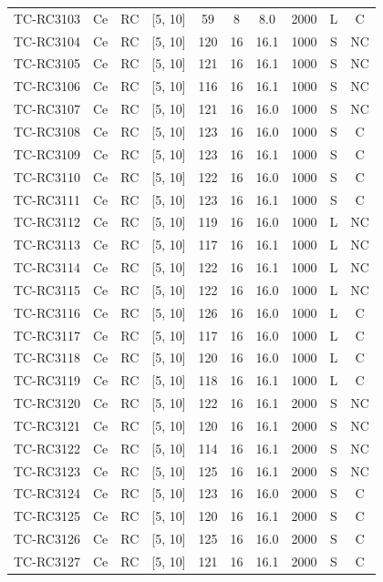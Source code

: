 \begin{longtable}{lccccccccc}
TC-RC3103 & Ce & RC & [5, 10] & 59 & 8 & 8.0 & 2000 & L & C \\
TC-RC3104 & Ce & RC & [5, 10] & 120 & 16 & 16.1 & 1000 & S & NC \\
TC-RC3105 & Ce & RC & [5, 10] & 121 & 16 & 16.1 & 1000 & S & NC \\
TC-RC3106 & Ce & RC & [5, 10] & 116 & 16 & 16.1 & 1000 & S & NC \\
TC-RC3107 & Ce & RC & [5, 10] & 121 & 16 & 16.0 & 1000 & S & NC \\
TC-RC3108 & Ce & RC & [5, 10] & 123 & 16 & 16.0 & 1000 & S & C \\
TC-RC3109 & Ce & RC & [5, 10] & 123 & 16 & 16.1 & 1000 & S & C \\
TC-RC3110 & Ce & RC & [5, 10] & 122 & 16 & 16.0 & 1000 & S & C \\
TC-RC3111 & Ce & RC & [5, 10] & 123 & 16 & 16.1 & 1000 & S & C \\
TC-RC3112 & Ce & RC & [5, 10] & 119 & 16 & 16.0 & 1000 & L & NC \\
TC-RC3113 & Ce & RC & [5, 10] & 117 & 16 & 16.1 & 1000 & L & NC \\
TC-RC3114 & Ce & RC & [5, 10] & 122 & 16 & 16.1 & 1000 & L & NC \\
TC-RC3115 & Ce & RC & [5, 10] & 122 & 16 & 16.0 & 1000 & L & NC \\
TC-RC3116 & Ce & RC & [5, 10] & 126 & 16 & 16.0 & 1000 & L & C \\
TC-RC3117 & Ce & RC & [5, 10] & 117 & 16 & 16.0 & 1000 & L & C \\
TC-RC3118 & Ce & RC & [5, 10] & 120 & 16 & 16.0 & 1000 & L & C \\
TC-RC3119 & Ce & RC & [5, 10] & 118 & 16 & 16.1 & 1000 & L & C \\
TC-RC3120 & Ce & RC & [5, 10] & 122 & 16 & 16.1 & 2000 & S & NC \\
TC-RC3121 & Ce & RC & [5, 10] & 120 & 16 & 16.1 & 2000 & S & NC \\
TC-RC3122 & Ce & RC & [5, 10] & 114 & 16 & 16.1 & 2000 & S & NC \\
TC-RC3123 & Ce & RC & [5, 10] & 125 & 16 & 16.1 & 2000 & S & NC \\
TC-RC3124 & Ce & RC & [5, 10] & 123 & 16 & 16.0 & 2000 & S & C \\
TC-RC3125 & Ce & RC & [5, 10] & 120 & 16 & 16.1 & 2000 & S & C \\
TC-RC3126 & Ce & RC & [5, 10] & 125 & 16 & 16.0 & 2000 & S & C \\
TC-RC3127 & Ce & RC & [5, 10] & 121 & 16 & 16.1 & 2000 & S & C \\

\end{longtable}
